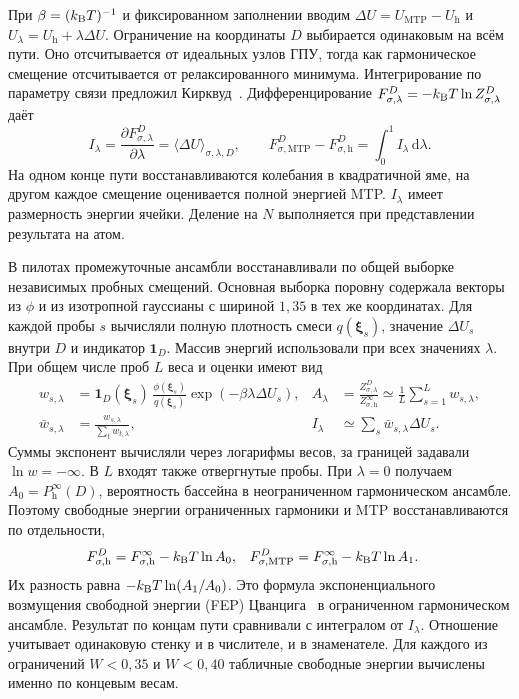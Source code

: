 \documentclass[11pt,a4paper]{article}
\begin{document}
При $\beta=(k_{\rm B}T)^{-1}$ и фиксированном заполнении вводим
$\Delta U=U_{\mathrm{MTP}}-U_{\mathrm h}$ и
$U_\lambda=U_{\mathrm h}+\lambda\Delta U$. Ограничение на координаты $D$
выбирается одинаковым на всём пути. Оно отсчитывается от идеальных узлов
ГПУ, тогда как гармоническое смещение отсчитывается от релаксированного
минимума. Интегрирование по параметру связи предложил
Кирквуд~\cite{kirkwood1935}. Дифференцирование
$F_{\sigma,\lambda}^D=-k_{\rm B}T\ln Z_{\sigma,\lambda}^D$ даёт
\begin{equation}
 I_\lambda=\frac{\partial F_{\sigma,\lambda}^D}{\partial\lambda}
  =\langle\Delta U\rangle_{\sigma,\lambda,D},\qquad
 F_{\sigma,\mathrm{MTP}}^D-F_{\sigma,\mathrm h}^D
  =\int_0^1 I_\lambda\,\mathrm d\lambda .
\end{equation}
На одном конце пути восстанавливаются колебания в квадратичной яме, на другом
каждое смещение оценивается полной энергией MTP. $I_\lambda$ имеет
размерность энергии ячейки. Деление на $N$ выполняется при представлении
результата на атом.

В пилотах промежуточные ансамбли восстанавливали по общей выборке независимых
пробных смещений. Основная выборка поровну содержала векторы из $\phi$ и из
изотропной гауссианы с шириной $1{,}35$ в тех же координатах. Для каждой
пробы $s$ вычисляли полную плотность смеси $q(\boldsymbol\xi_s)$, значение
$\Delta U_s$ внутри $D$ и индикатор $\mathbf 1_D$. Массив энергий использовали
при всех значениях $\lambda$. При общем числе проб $L$ веса и оценки имеют вид
\begin{align}
 w_{s,\lambda}
 &=\mathbf 1_D(\boldsymbol\xi_s)\,
   \frac{\phi(\boldsymbol\xi_s)}{q(\boldsymbol\xi_s)}
                 \exp(-\beta\lambda\Delta U_s),&
 A_\lambda&=\frac{Z_{\sigma,\lambda}^D}{Z_{\sigma,\mathrm h}^{\infty}}
          \simeq \frac1L\sum_{s=1}^L w_{s,\lambda},\\
 \bar w_{s,\lambda}&=\frac{w_{s,\lambda}}{\sum_t w_{t,\lambda}},&
 I_\lambda&\simeq\sum_s\bar w_{s,\lambda}\Delta U_s .
\end{align}
Суммы экспонент вычисляли через логарифмы весов, за границей задавали
$\ln w=-\infty$. В $L$ входят также отвергнутые пробы. При $\lambda=0$
получаем $A_0=P_{\mathrm h}^\infty(D)$, вероятность бассейна в
неограниченном гармоническом ансамбле. Поэтому свободные энергии
ограниченных гармоники и MTP восстанавливаются по отдельности,
\begin{align}
 F_{\sigma,\mathrm h}^D&=F_{\sigma,\mathrm h}^\infty-k_{\rm B}T\ln A_0,&
 F_{\sigma,\mathrm{MTP}}^D&=F_{\sigma,\mathrm h}^\infty-k_{\rm B}T\ln A_1 .
\end{align}
Их разность равна $-k_{\rm B}T\ln(A_1/A_0)$. Это формула экспоненциального
возмущения свободной энергии (FEP) Цванцига~\cite{zwanzig1954} в
ограниченном гармоническом ансамбле. Результат по концам пути
сравнивали с интегралом от $I_\lambda$. Отношение учитывает одинаковую
стенку и в числителе, и в знаменателе. Для каждого из ограничений
$W<0{,}35$ и $W<0{,}40$ табличные свободные энергии вычислены именно по
концевым весам.
\end{document}
